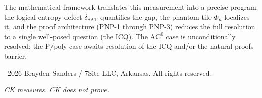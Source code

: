 \documentclass[11pt]{article}
\theoremstyle{definition}
\theoremstyle{remark}
\newcommand{\Ppoly}{\mathrm{P/poly}}
\newcommand{\ACz}{\mathrm{AC}^0}
\newcommand{\dSAT}{\delta_{\mathrm{SAT}}}
\begin{document}
The mathematical framework translates this measurement into a precise
program: the logical entropy defect $\dSAT$ quantifies the gap, the
phantom tile $\Phi_n$ localizes it, and the proof architecture (PNP-1
through PNP-3) reduces the full resolution to a single well-posed
question (the ICQ).  The $\ACz$ case is unconditionally resolved; the
$\Ppoly$ case awaits resolution of the ICQ and/or the natural proofs
barrier.

\bigskip

\noindent
\textcopyright\ 2026 Brayden Sanders / 7Site LLC, Arkansas.
All rights reserved.

\bigskip

\noindent\textit{CK measures. CK does not prove.}

\end{document}
